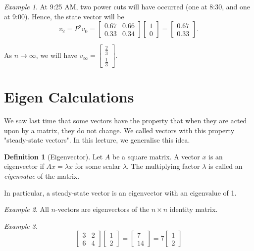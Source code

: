 \documentclass[10pt, a4paper]{amsart}
\theoremstyle{definition}
\newtheorem{defn}{Definition}
\theoremstyle{remark}
\newtheorem{ex}{Example}
\begin{document}
\begin{ex}
  At 9:25 AM, two power cuts will have occurred (one at 8:30, and one at 9:00). Hence, the state
  vector will be
  \begin{displaymath}
    v_2 = P^2 v_0 = \begin{bmatrix} 0.67 & 0.66 \\ 0.33 & 0.34 \end{bmatrix} \begin{bmatrix} 1 \\ 0 \end{bmatrix} = \begin{bmatrix} 0.67 \\ 0.33 \end{bmatrix}.
  \end{displaymath}

  As $ n \to \infty $, we will have $ v_\infty = \begin{bmatrix} \frac{2}{3} \\ \frac{1}{3} \end{bmatrix} $.
\end{ex}

\section{Eigen Calculations}
We saw last time that some vectors have the property that when they are acted upon by a matrix, they do not change. We
called vectors with this property "steady-state vectors". In this lecture, we generalise this idea.

\begin{defn}[Eigenvector]
  Let $ A $ be a square matrix. A vector $ x $ is an eigenvector if $ Ax = \lambda x $ for some scalar $ \lambda $.
  The multiplying factor $ \lambda $ is called an \emph{eigenvalue} of the matrix.
\end{defn}

In particular, a steady-state vector is an eigenvector with an eigenvalue of 1.

\begin{ex}
  All $n$-vectors are eigenvectors of the $n \times n $ identity matrix.
\end{ex}

\begin{ex}
  \begin{displaymath}
    \begin{bmatrix} 3 & 2 \\ 6 & 4 \end{bmatrix} \begin{bmatrix} 1 \\ 2 \end{bmatrix} = \begin{bmatrix} 7 \\ 14 \end{bmatrix} = 7\begin{bmatrix} 1 \\ 2 \end{bmatrix}
  \end{displaymath}
\end{ex}
\end{document}

